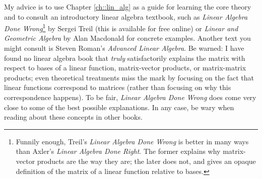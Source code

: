 My advice is to use Chapter \ref{ch::lin_alg} as a guide for learning the core theory and to consult an introductory linear algebra textbook, such as \textit{Linear Algebra Done Wrong}\footnote{Funnily enough, Treil's \textit{Linear Algebra Done Wrong} is better in many ways than Axler's \textit{Linear Algebra Done Right}. The former explains why matrix-vector products are the way they are; the later does not, and gives an opaque definition of the matrix of a linear function relative to bases.} by Sergei Treil (this is available for free online) or \textit{Linear and Geometric Algebra} by Alan Macdonald for concrete examples. Another text you might consult is Steven Roman's \textit{Advanced Linear Algebra}. Be warned: I have found no linear algebra book that \textit{truly} satisfactorily explains the matrix with respect to bases of a linear function, matrix-vector products, or matrix-matrix products; even theoretical treatments miss the mark by focusing on the fact that linear functions correspond to matrices (rather than focusing on why this correspondence happens). To be fair, \textit{Linear Algebra Done Wrong} does come very close to some of the best possible explanations. In any case, be wary when reading about these concepts in other books.